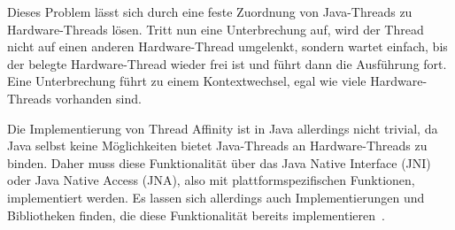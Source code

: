 \documentclass[12pt,a4paper,listof=toc,parskip=half,numbers=noenddot,abstract=true]{scrartcl}
\begin{document}
Dieses Problem lässt sich durch eine feste Zuordnung von Java-Threads zu Hardware-Threads lösen. Tritt nun eine Unterbrechung auf, wird der Thread nicht auf einen anderen Hardware-Thread umgelenkt, sondern wartet einfach, bis der belegte Hardware-Thread wieder frei ist und führt dann die Ausführung fort. Eine Unterbrechung führt zu einem Kontextwechsel, egal wie viele Hardware-Threads vorhanden sind.

Die Implementierung von Thread Affinity ist in Java allerdings nicht trivial, da Java selbst keine Möglichkeiten bietet Java-Threads an Hardware-Threads zu binden. Daher muss diese Funktionalität über das Java Native Interface (JNI) oder Java Native Access (JNA), also mit plattformspezifischen Funktionen, implementiert werden. Es lassen sich allerdings auch Implementierungen und Bibliotheken finden, die diese Funktionalität bereits implementieren~\cite{ChronicleSoftware,Cheremin2011}.

\pagebreak
{}
\printnoidxglossary[type=main,style=longheader]
\pagebreak
{}
\printnoidxglossary[type=acronym,style=longheader]

\pagebreak
\printbibliography[title={Literaturverzeichnis},heading=bibintoc,notkeyword=online]

\pagebreak
\printbibliography[title={Quellenverzeichnis},heading=bibintoc,keyword=online] 



\end{document}
